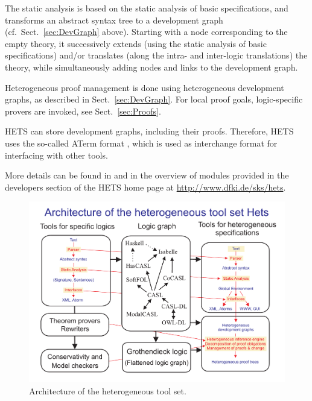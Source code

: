 \documentclass{article}
\newcommand{\normalTEXTSC}[2]{{#1\scriptsize#2}}
\newcommand     {\Hets}{\normalTEXTSC{H}{ETS}\xspace}
\begin{document}
The static analysis is based on the static analysis of basic
specifications, and transforms an abstract syntax tree to a
development graph (cf.\ Sect.~\ref{sec:DevGraph} above).  Starting with a
node corresponding to the empty theory, it successively extends (using
the static analysis of basic specifications) and/or translates (along
the intra- and inter-logic translations) the theory, while
simultaneously adding nodes and links to the development graph.

Heterogeneous proof management is done using heterogeneous
development graphs, as described in Sect.~\ref{sec:DevGraph}.
For local proof goals, logic-specific provers are invoked,
see Sect.~\ref{sec:Proofs}.

\Hets can store development graphs, including their proofs.
Therefore, \Hets uses the so-called
ATerm format \cite{BJKO00}, which is used as interchange format
for interfacing with other tools.

More details can be found in \cite{Habil,MossakowskiEtAl07b}
and in the overview of modules provided in the developers section
of the \Hets home page at \url{http://www.dfki.de/sks/hets}.

\begin{figure}
\begin{center}
\includegraphics[scale=0.4]{hets2007}
\end{center}
%
\caption{Architecture of the heterogeneous tool set.
\label{fig:hets}}
\end{figure}

\bigskip
\end{document}

